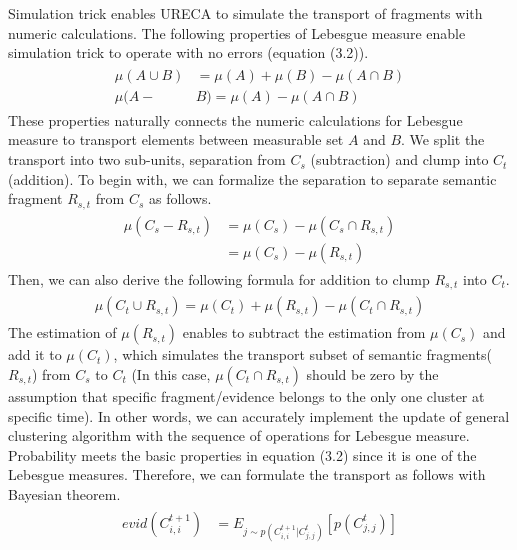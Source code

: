 Simulation trick enables URECA to simulate the transport of fragments with numeric calculations.
The following properties of Lebesgue measure enable simulation trick to operate with no errors (equation (3.2)).
\begin{align}
\label{lebesgue_property_union_diff}
\begin{split}
\mu(A \cup B) &= \mu(A)+\mu(B) - \mu(A \cap B)\\ 
\mu(A-&B)=\mu(A)-\mu(A \cap B)
\end{split}
\end{align}
These properties naturally connects the numeric calculations for Lebesgue measure to transport elements between measurable set $A$ and $B$.
We split the transport into two sub-units, separation from $C_s$ (subtraction) and clump into $C_t$ (addition).
To begin with, we can formalize the separation to separate semantic fragment $R_{s,t}$ from $C_s$ as follows.
\begin{align}
\label{lebesgue_property_diff_fragment}
\begin{split}
\mu(C_s-R_{s,t})  &= \mu(C_s)-\mu(C_s \cap R_{s,t})\\
                  &=\mu(C_s)-\mu(R_{s,t})
\end{split}
\end{align}
Then, we can also derive the following formula for addition to clump $R_{s,t}$ into $C_t$.
\begin{align}
\label{lebesgue_property_union_fragment}
\begin{split}
\mu(C_t \cup R_{s,t})=\mu(C_t)+\mu(R_{s,t})-\mu(C_t \cap R_{s,t})
\end{split}
\end{align}
The estimation of $\mu(R_{s,t})$ enables to subtract the estimation from $\mu(C_s)$ and add it to $\mu(C_t)$, 
which simulates the transport subset of semantic fragments($R_{s,t}$) from $C_s$ to $C_t$
(In this case, $\mu(C_t \cap R_{s,t}) $ should be zero by the assumption that specific fragment/evidence belongs 
to the only one cluster at specific time).
In other words, we can accurately implement the update of general clustering algorithm 
with the sequence of operations for Lebesgue measure.
Probability meets the basic properties in equation (3.2) since it is one of the Lebesgue measures.
Therefore, we can formulate the transport as follows with Bayesian theorem.
\begin{align}
\label{evidence_for_prob}
\begin{split}
evid(C^{t+1}_{i,i})&=E_{j\sim p(C^{t+1}_{i,i}|C^t_{j,j})}[p(C^t_{j,j})]
\end{split}
\end{align}
